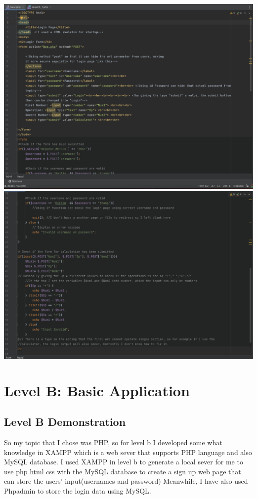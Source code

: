\documentclass[a4paper, 11pt]{report}
\begin{document}
\includegraphics[width=1\textwidth]{1}
\includegraphics[width=1\textwidth]{2}

\newpage
\section{Level B: Basic Application}
\subsection{Level B Demonstration}
So my topic that I chose was PHP, so for level b I developed some what knowledge in XAMPP which is a web sever that supports PHP language and also MySQL database. I used XAMPP in level b to generate a local sever for me to use php html css with the MySQL database to create a sign up web page that can store the users' input(usernames and password)
Meanwhile, I have also used Phpadmin to store the login data using MySQL.
\end{document}
